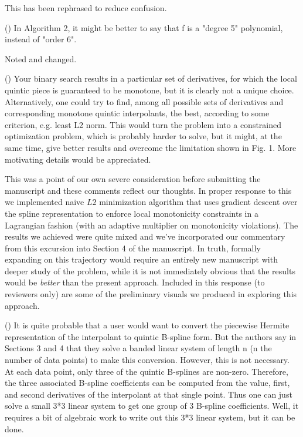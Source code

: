 This has been rephrased to reduce confusion.

{\parindent=20pt \it
  
\item{()} In Algorithm 2, it might be better to say that f is a "degree 5" polynomial, instead of "order 6".

}

Noted and changed.

{\parindent=20pt \it
  
\item{()} Your binary search results in a particular set of derivatives, for which the local quintic piece is guaranteed to be monotone, but it is clearly not a unique choice. Alternatively, one could try to find, among all possible sets of derivatives and corresponding monotone quintic interpolants, the best, according to some criterion, e.g. least L2 norm. This would turn the problem into a constrained optimization problem, which is probably harder to solve, but it might, at the same time, give better results and overcome the limitation shown in Fig. 1. More motivating details would be appreciated.

}

This was a point of our own severe consideration before submitting the manuscript and these comments reflect our thoughts. In proper response to this we implemented naive $L2$ minimization algorithm that uses gradient descent over the spline representation to enforce local monotonicity constraints in a Lagrangian fashion (with an adaptive multiplier on monotonicity violations). The results we achieved were quite mixed and we've incorporated our commentary from this excursion into Section 4 of the manuscript. In truth, formally expanding on this trajectory would require an entirely new manuscript with deeper study of the problem, while it is not immediately obvious that the results would be {\it better} than the present approach. Included in this response (to reviewers only) are some of the preliminary visuals we produced in exploring this approach.

{\parindent=20pt \it
  
\item{()} It is quite probable that a user would want to convert the piecewise Hermite representation of the interpolant to quintic B-spline form. But the authors say in Sections 3 and 4 that they solve a banded linear system of length n (n the number of data points) to make this conversion. However, this is not necessary. At each data point, only three of the quintic B-splines are non-zero. Therefore, the three associated B-spline coefficients can be computed from the value, first, and second derivatives of the interpolant at that single point. Thus one can just solve a small 3*3 linear system to get one group of 3 B-spline coefficients. Well, it requires a bit of algebraic work to write out this 3*3 linear system, but it can be done.

}

